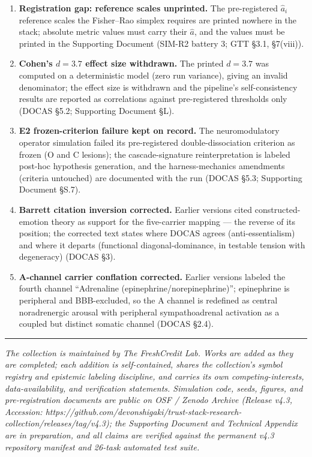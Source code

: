 \documentclass[
]{article}
\begin{document}
\begin{enumerate}
  net-negative at \(m = 1000\); inclusion NNE \(\approx\) 3.7--5, gated
  by cold-start seeding) declares Boost-based and global NNTs not
  computable without new data (SIM-R2 battery 6; whitepaper §4.4).
\item
  \textbf{Registration gap: reference scales unprinted.} The
  pre-registered \(\hat{a}_i\) reference scales the Fisher--Rao simplex
  requires are printed nowhere in the stack; absolute metric values must
  carry their \(\hat{a}\), and the values must be printed in the
  Supporting Document (SIM-R2 battery 3; GTT §3.1, §7(viii)).
\item
  \textbf{Cohen's \(d = 3.7\) effect size withdrawn.} The printed
  \(d = 3.7\) was computed on a deterministic model (zero run variance),
  giving an invalid denominator; the effect size is withdrawn and the
  pipeline's self-consistency results are reported as correlations
  against pre-registered thresholds only (DOCAS §5.2; Supporting
  Document §L).
\item
  \textbf{E2 frozen-criterion failure kept on record.} The
  neuromodulatory operator simulation failed its pre-registered
  double-dissociation criterion as frozen (O and C lesions); the
  cascade-signature reinterpretation is labeled post-hoc hypothesis
  generation, and the harness-mechanics amendments (criteria untouched)
  are documented with the run (DOCAS §5.3; Supporting Document §S.7).
\item
  \textbf{Barrett citation inversion corrected.} Earlier versions cited
  constructed-emotion theory as support for the five-carrier mapping ---
  the reverse of its position; the corrected text states where DOCAS
  agrees (anti-essentialism) and where it departs (functional
  diagonal-dominance, in testable tension with degeneracy) (DOCAS §3).
\item
  \textbf{A-channel carrier conflation corrected.} Earlier versions
  labeled the fourth channel ``Adrenaline
  (epinephrine/norepinephrine)''; epinephrine is peripheral and
  BBB-excluded, so the A channel is redefined as central noradrenergic
  arousal with peripheral sympathoadrenal activation as a coupled but
  distinct somatic channel (DOCAS §2.4).
\end{enumerate}

\begin{center}\rule{0.5\linewidth}{0.5pt}\end{center}

\emph{The collection is maintained by The FreshCredit Lab. Works are
added as they are completed; each addition is self-contained, shares the
collection's symbol registry and epistemic labeling discipline, and
carries its own competing-interests, data-availability, and verification
statements. Simulation code, seeds, figures, and pre-registration
documents are public on OSF / Zenodo Archive (Release v4.3, Accession:
https://github.com/devonshigaki/trust-stack-research-collection/releases/tag/v4.3);
the Supporting Document and Technical Appendix are in preparation, and
all claims are verified against the permanent v4.3 repository manifest
and 26-task automated test suite.}
\end{document}
